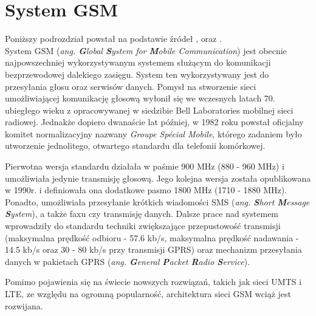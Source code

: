 \section{System GSM}
\label{GSM}

Poniższy podrozdział powstał na podstawie źródeł \cite{GSM}, \cite{GSM_tutorialspoint} oraz \cite{GSM_wiki}.\\

System GSM (\textit{ang. \textbf{G}lobal \textbf{S}ystem for \textbf{M}obile Communication}) jest obecnie najpowszechniej wykorzystywanym systemem służącym do komunikacji bezprzewodowej dalekiego zasięgu. System ten wykorzystywany jest do przesyłania głosu oraz serwisów danych. Pomysł na stworzenie sieci umożliwiającej komunikację głosową wyłonił się we wczesnych latach 70. ubiegłego wieku z opracowywanej w siedzibie Bell Laboratories mobilnej sieci radiowej. Jednakże dopiero dwanaście lat później, w 1982 roku powstał oficjalny komitet normalizacyjny nazwany \textit{Groupe Spécial Mobile}, którego zadaniem było utworzenie jednolitego, otwartego standardu dla telefonii komórkowej. 

Pierwotna wersja standardu działała w paśmie 900 MHz (880 - 960 MHz) i umożliwiała jedynie transmisję głosową. Jego kolejna wersja została opublikowana w 1990r. i definiowała ona dodatkowe pasmo 1800 MHz (1710 - 1880 MHz). Ponadto, umożliwiała przesyłanie krótkich wiadomości SMS (\textit{ang. \textbf{S}hort \textbf{M}essage \textbf{S}ystem}), a także faxu czy transmisję danych. Dalsze prace nad systemem wprowadziły do standardu techniki zwiększające przepustowość transmisji (maksymalna prędkość odbioru - 57.6 kb/s, maksymalna prędkość nadawania - 14.5 kb/s oraz 30 - 80 kb/s przy transmisji GPRS) oraz mechanizm przesyłania danych w pakietach GPRS (\textit{ang. \textbf{G}eneral \textbf{P}acket \textbf{R}adio \textbf{S}ervice}). 

Pomimo pojawienia się na świecie nowszych rozwiązań, takich jak sieci UMTS i LTE, ze względu na ogromną popularność, architektura sieci GSM wciąż jest rozwijana. 

